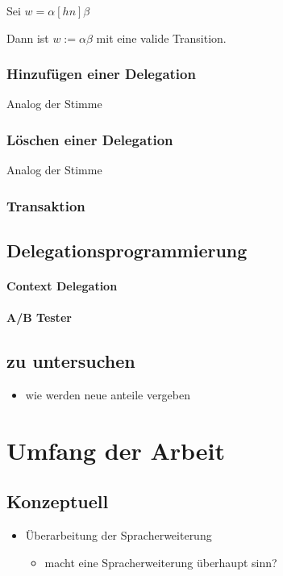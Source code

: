 \documentclass[]{article}
\begin{document}
Sei $w=\alpha [hn]\beta$

Dann ist $w:=\alpha\beta$ mit eine valide Transition.

\subsubsection*{Hinzufügen einer Delegation}
Analog der Stimme

\subsubsection*{Löschen einer Delegation}
Analog der Stimme

\subsubsection*{Transaktion} %

\subsection{Delegationsprogrammierung}

\paragraph{Context Delegation}
\paragraph{A/B Tester}

\subsection{zu untersuchen}

\begin{itemize}
\itemsep1pt\parskip0pt
\item
  wie werden neue anteile vergeben
\end{itemize}


\section{Umfang der Arbeit}

\subsection*{Konzeptuell}
\begin{itemize}
  \item Überarbeitung der Spracherweiterung
    \begin{itemize}
      \item macht eine Spracherweiterung überhaupt sinn?
    \end{itemize}
\end{itemize}
\end{document}
